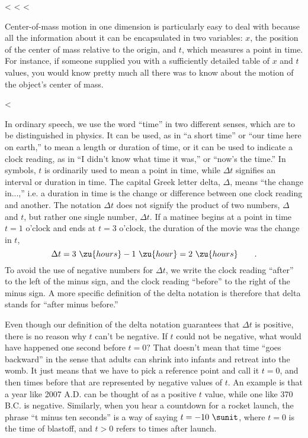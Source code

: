   <%
<%
<%

Center-of-mass motion in one dimension is particularly easy
to deal with because all the information about it can be
encapsulated in two variables: $x$, the position of the
center of mass relative to the origin, and $t$, which
measures a point in time. For instance, if someone supplied
you with a sufficiently detailed table of $x$ and $t$
values, you would know pretty much all there was to know
about the motion of the object's center of mass.

  <%

In ordinary speech, we use the word ``time'' in two
different senses, which are to be distinguished in physics.
It can be used, as in ``a short time'' or ``our time here on
earth,'' to mean a length or duration of time, or it can be
used to indicate a clock reading, as in ``I didn't know what
time it was,'' or ``now's the time.'' In symbols, $t$ is
ordinarily used to mean a point in time, while $\Delta t$
signifies an interval or duration in time. The capital Greek
letter delta, $\Delta $, means ``the change in...,'' i.e. a
duration in time is the change or difference between one
clock reading and another. The notation $\Delta t$ does not
signify the product of two numbers, $\Delta $ and $t$, but
rather one single number, $\Delta t$. If a matinee begins at
a point in time $t=1$ o'clock and ends at $t=3$ o'clock, the
duration of the movie was the change in $t$,
\begin{equation*}
     \Delta t=3\ \zu{hours} - 1\ \zu{hour} =  2\ \zu{hours}   \qquad   .
\end{equation*}
To avoid the use of negative numbers for $\Delta t$, we
write the clock reading ``after'' to the left of the minus
sign, and the clock reading ``before'' to the right of the
minus sign. A more specific definition of the delta notation is therefore that delta stands for
``after minus before.''

Even though our definition of the delta notation guarantees
that $\Delta t$ is positive, there is no reason why $t$
can't be negative. If $t$ could not be negative, what would
have happened one second before $t=0?$ That doesn't mean
that time ``goes backward'' in the sense that adults can
shrink into infants and retreat into the womb. It just means
that we have to pick a reference point and call it $t=0$,
and then times before that are represented by negative values of $t$.
An example is that a year like 2007 A.D. can be thought of as a positive
$t$ value, while one like 370 B.C. is negative. Similarly, when you
hear a countdown for a rocket launch, the phrase ``t minus ten seconds''
is a way of saying $t=-10\ \sunit$, where $t=0$ is the time of blastoff,
and $t>0$ refers to times after launch.

